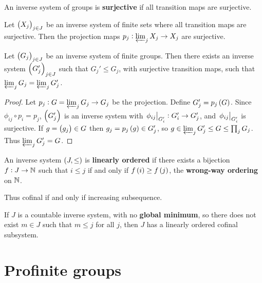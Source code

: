 \pagebreak

\begin{definition*}
An inverse system of groups is \textbf{surjective} if all transition maps are surjective.
\end{definition*}

\begin{proposition}
Let $ \br{X_j}_{j \in J} $ be an inverse system of finite sets where all transition maps are surjective. Then the projection maps $ p_j : \varprojlim_j X_j \to X_j $ are surjective.
\end{proposition}

\begin{proposition}
\label{prop:1.3.7}
Let $ \br{G_j}_{j \in J} $ be an inverse system of finite groups. Then there exists an inverse system $ \br{G_j'}_{j \in J} $ such that $ G_j' \le G_j $, with surjective transition maps, such that $ \varprojlim_j G_j = \varprojlim_j G_j' $.
\end{proposition}

\begin{proof}
Let $ p_j : G = \varprojlim_j G_j \to G_j $ be the projection. Define $ G_j' = p_j\br{G} $. Since $ \phi_{ij} \circ p_i = p_j $, $ \br{G_j'} $ is an inverse system with $ \left. \phi_{ij} \right|_{G_i'} : G_i' \to G_j' $, and $ \left. \phi_{ij} \right|_{G_i'} $ is surjective. If $ g = \br{g_j} \in G $ then $ g_j = p_j\br{g} \in G_j' $, so $ g \in \varprojlim_j G_j' \le G \le \prod_j G_j $. Thus $ \varprojlim_j G_j' = G $.
\end{proof}

\begin{definition*}
An inverse system $ \br{J, \le} $ is \textbf{linearly ordered} if there exists a bijection $ f : J \to \mathbb{N} $ such that $ i \le j $ if and only if $ f\br{i} \ge f\br{j} $, the \textbf{wrong-way ordering} on $ \mathbb{N} $.
\end{definition*}

Thus cofinal if and only if increasing subsequence.

\begin{proposition}
\label{prop:1.3.11}
If $ J $ is a countable inverse system, with no \textbf{global minimum}, so there does not exist $ m \in J $ such that $ m \le j $ for all $ j $, then $ J $ has a linearly ordered cofinal subsystem.
\end{proposition}

\pagebreak

\section{Profinite groups}

